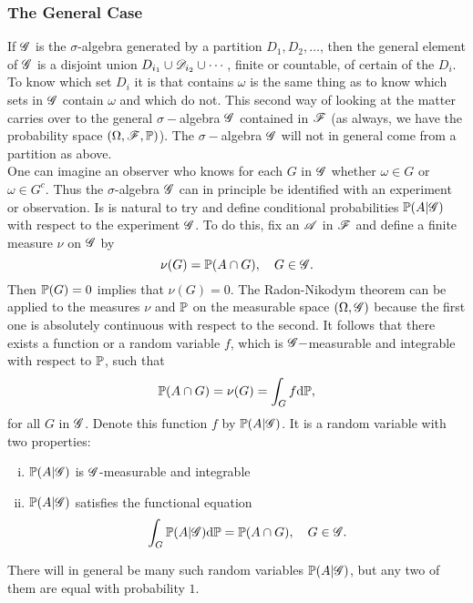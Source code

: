 \subsubsection{The General Case}
If $\mathcal{G}$ is the $\sigma$-algebra generated by a partition $D_1, D_2, \dots$, then the general element of $\mathcal{G}$ is a disjoint union $D_{i_1} \cup \mathcal{D}_{i_2} \cup \cdots$, finite or countable, of certain of the $D_i$. To know which set $D_i$ it is that contains $\omega$ is the same thing as to know which sets in $\mathcal{G}$ contain $\omega$ and which do not. This second way of looking at the matter carries over to the general $\sigma-$algebra $\mathcal{G}$ contained in $\mathcal{F}$ (as always, we have the probability space $(\Omega, \mathcal{F}, \mathbb{P})$). The $\sigma-$algebra $\mathcal{G}$ will not in general come from a partition as above.\\

One can imagine an observer who knows for each $G$ in $\mathcal{G}$ whether $\omega \in G$ or $\omega \in G^c$. Thus the $\sigma$-algebra $\mathcal{G}$ can in principle be identified with an experiment or observation. Is is natural to try and define conditional probabilities $\mathbb{P}(A | \mathcal{G})$ with respect to the experiment $\mathcal{G}$. To do this, fix an $\mathcal{A}$ in $\mathcal{F}$ and define a finite measure $\nu$ on $\mathcal{G}$ by
\begin{equation}
    \nu (G) = \mathbb{P}(A \cap G), \quad G \in \mathcal{G}.
\end{equation}
Then $\mathbb{P}(G) = 0$ implies that $\nu (G) = 0$. The Radon-Nikodym theorem can be applied to the measures $\nu$ and $\mathbb{P}$ on the measurable space $(\Omega, \mathcal{G})$ because the first one is absolutely continuous with respect to the second. It follows that there exists a function or a random variable $f$, which is $\mathcal{G}-$measurable and integrable with respect to $\mathbb{P}$, such that 
\begin{equation}
    \mathbb{P}(A \cap G) = \nu (G) = \int_G f \mathrm{d} \mathbb{P},
\end{equation}
for all $G$ in $\mathcal{G}$. Denote this function $f$ by $\mathbb{P}(A | \mathcal{G})$. It is a random variable with two properties:
\begin{enumerate}[(i)]
    \item $\mathbb{P}(A | \mathcal{G})$ is $\mathcal{G}$-measurable and integrable
    \item $\mathbb{P}(A | \mathcal{G})$ satisfies the functional equation
    \begin{equation} \label{eq:conditional_probability_sigma_algebra}
        \int_G \mathbb{P}(A | \mathcal{G}) \mathrm{d} \mathbb{P} = \mathbb{P}(A \cap G), \quad G \in \mathcal{G}.
    \end{equation}
\end{enumerate}
There will in general be many such random variables $\mathbb{P}(A | \mathcal{G})$, but any two of them are equal with probability $1$.\\

